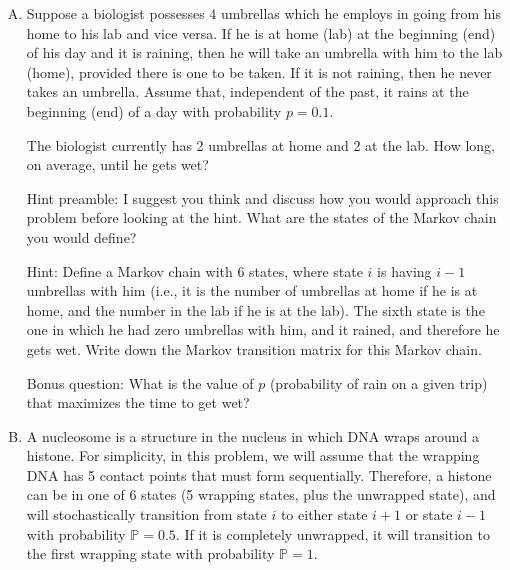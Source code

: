 \documentclass[12pt,letterpaper]{article}
\begin{document}
\begin{enumerate}[A.]

\item

Suppose a biologist possesses $4$ umbrellas which he employs in going from his home to his lab and vice versa. 
If he is at home (lab) at the beginning (end) of his day and it is raining, then he will take an umbrella with him to the lab (home), provided there is one to be taken. 
If it is not raining, then he never takes an umbrella. 
Assume that, independent of the past, it rains at the beginning (end) of a day with probability $p=0.1$.

The biologist currently has 2 umbrellas at home and 2 at the lab. 
How long, on average, until he gets wet? 

\vspace{3em}

Hint preamble: I suggest you think and discuss how you would approach this problem before looking at the hint. What are the states of the Markov chain you would define?

Hint: Define a Markov chain with $6$ states, where state $i$ is having $i-1$ umbrellas with him (i.e., it is the number of umbrellas at home if he is at home, and the number in the lab if he is at the lab). The sixth state is the one in which he had zero umbrellas with him, and it rained, and therefore he gets wet. Write down the Markov transition matrix for this Markov chain. 

Bonus question: What is the value of $p$ (probability of rain on a given trip) that maximizes the time to get wet? 


\vspace{3em}


\item %

A nucleosome is a structure in the nucleus in which DNA wraps around a histone.
For simplicity, in this problem, we will assume that the wrapping DNA has 5 contact points that must form sequentially. 
Therefore, a histone can be in one of 6 states (5 wrapping states, plus the unwrapped state), and will stochastically transition from state $i$ to either state $i+1$ or state $i-1$ with probability $\mathbb{P}=0.5$.
If it is completely unwrapped, it will transition to the first wrapping state with probability $\mathbb{P}=1$.


\end{enumerate}
\end{document}
